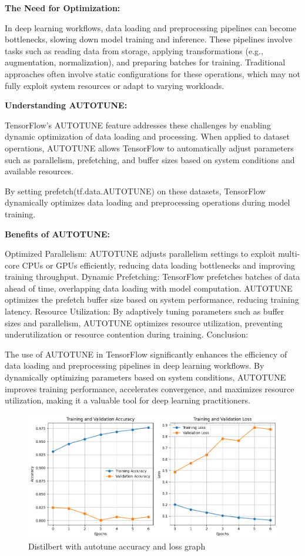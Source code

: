 \textbf{The Need for Optimization:}

In deep learning workflows, data loading and preprocessing pipelines can become bottlenecks, slowing down model training and inference. These pipelines involve tasks such as reading data from storage, applying transformations (e.g., augmentation, normalization), and preparing batches for training. Traditional approaches often involve static configurations for these operations, which may not fully exploit system resources or adapt to varying workloads.

\textbf{Understanding AUTOTUNE:}

TensorFlow's AUTOTUNE feature addresses these challenges by enabling dynamic optimization of data loading and processing. When applied to dataset operations, AUTOTUNE allows TensorFlow to automatically adjust parameters such as parallelism, prefetching, and buffer sizes based on system conditions and available resources.

By setting prefetch(tf.data.AUTOTUNE) on these datasets, TensorFlow dynamically optimizes data loading and preprocessing operations during model training.

\textbf{Benefits of AUTOTUNE:}

Optimized Parallelism: AUTOTUNE adjusts parallelism settings to exploit multi-core CPUs or GPUs efficiently, reducing data loading bottlenecks and improving training throughput.
Dynamic Prefetching: TensorFlow prefetches batches of data ahead of time, overlapping data loading with model computation. AUTOTUNE optimizes the prefetch buffer size based on system performance, reducing training latency.
Resource Utilization: By adaptively tuning parameters such as buffer sizes and parallelism, AUTOTUNE optimizes resource utilization, preventing underutilization or resource contention during training.
Conclusion:

The use of AUTOTUNE in TensorFlow significantly enhances the efficiency of data loading and preprocessing pipelines in deep learning workflows. By dynamically optimizing parameters based on system conditions, AUTOTUNE improves training performance, accelerates convergence, and maximizes resource utilization, making it a valuable tool for deep learning practitioners.
\usepackage{float}
\begin{figure}[H]
    \centering
    \includegraphics[scale=0.7]{figures/autotune_trainingValidation.png}
    \caption{Distilbert with autotune accuracy and loss graph}
\end{figure}


